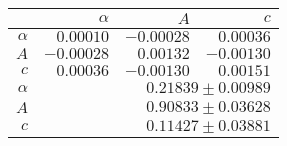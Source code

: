 \begin{table}
\caption{}
\centering
 \begin{tabular}{|r|r|r|r|}
 \hline 
\cellcolor{tabcolor}&\cellcolor{tabcolor}$\alpha$&\cellcolor{tabcolor}$A$&\cellcolor{tabcolor}$c$\\ \hline 
 \cellcolor{tabcolor}$\alpha$&$0.00010$ &$-0.00028$ &$0.00036$ \\ 
\cellcolor{tabcolor}$A$&$-0.00028$ &$0.00132$ &$-0.00130$ \\ 
\cellcolor{tabcolor}$c$&$0.00036$ &$-0.00130$ &$0.00151$ \\ \hline \hline
\cellcolor{tabcolor}$\alpha$&\multicolumn{3}{r|}{$0.21839 \pm 0.00989$ }\\ 
\cellcolor{tabcolor}$A$&\multicolumn{3}{r|}{$0.90833 \pm 0.03628$ }\\ 
\cellcolor{tabcolor}$c$&\multicolumn{3}{r|}{$0.11427 \pm 0.03881$ }\\ 
\hline\end{tabular}
\end{table}
